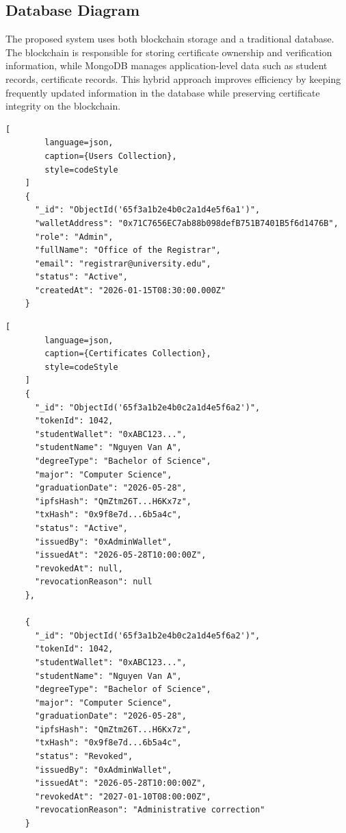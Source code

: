\subsection{Database Diagram}

The proposed system uses both blockchain storage and a traditional database. The blockchain is responsible for storing certificate ownership and verification information, while MongoDB manages application-level data such as student records, certificate records. This hybrid approach improves efficiency by keeping frequently updated information in the database while preserving certificate integrity on the blockchain.



\begin{lstlisting}[
        language=json, 
        caption={Users Collection},
        style=codeStyle
    ]
    {
      "_id": "ObjectId('65f3a1b2e4b0c2a1d4e5f6a1')",
      "walletAddress": "0x71C7656EC7ab88b098defB751B7401B5f6d1476B",
      "role": "Admin",
      "fullName": "Office of the Registrar",
      "email": "registrar@university.edu",
      "status": "Active",
      "createdAt": "2026-01-15T08:30:00.000Z"
    }
\end{lstlisting}

\begin{lstlisting}[
        language=json, 
        caption={Certificates Collection},
        style=codeStyle
    ]
    {
      "_id": "ObjectId('65f3a1b2e4b0c2a1d4e5f6a2')",
      "tokenId": 1042,
      "studentWallet": "0xABC123...",
      "studentName": "Nguyen Van A",
      "degreeType": "Bachelor of Science",
      "major": "Computer Science",
      "graduationDate": "2026-05-28",
      "ipfsHash": "QmZtm26T...H6Kx7z",
      "txHash": "0x9f8e7d...6b5a4c",
      "status": "Active",
      "issuedBy": "0xAdminWallet",
      "issuedAt": "2026-05-28T10:00:00Z",
      "revokedAt": null,
      "revocationReason": null
    },

    {
      "_id": "ObjectId('65f3a1b2e4b0c2a1d4e5f6a2')",
      "tokenId": 1042,
      "studentWallet": "0xABC123...",
      "studentName": "Nguyen Van A",
      "degreeType": "Bachelor of Science",
      "major": "Computer Science",
      "graduationDate": "2026-05-28",
      "ipfsHash": "QmZtm26T...H6Kx7z",
      "txHash": "0x9f8e7d...6b5a4c",
      "status": "Revoked",
      "issuedBy": "0xAdminWallet",
      "issuedAt": "2026-05-28T10:00:00Z",
      "revokedAt": "2027-01-10T08:00:00Z",
      "revocationReason": "Administrative correction"
    }
\end{lstlisting}

